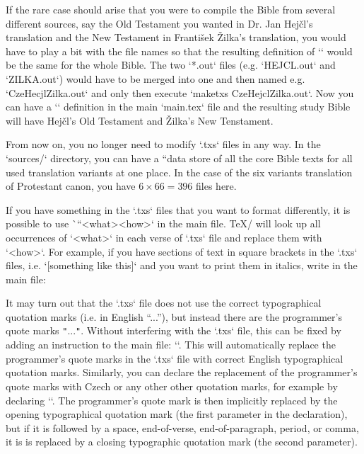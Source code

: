 {If the rare case should arise that you were to compile the Bible from several different sources, say the Old Testament you wanted in Dr. Jan Hejčl's translation and the New Testament in František Žilka's translation, you would have to play a bit with the file names so that the resulting definition of `\tmark` would be the same for the whole Bible. The two `*.out` files (e.g. `HEJCL.out` and `ZILKA.out`) would have to be merged into one and then named e.g. `CzeHecjlZilka.out` and  only then execute `maketxs CzeHejclZilka.out`.  Now you can have a `\def\tmark{HejclZilka}` definition in the main `main.tex` file and 
the resulting study Bible will have Hejčl's Old Testament and Žilka's New Tenstament.




From now on, you no longer need to modify  `.txs` files in any way.
In the `sources/` directory, you can have a “data store of all the core Bible texts for all used translation variants at one place. In the case of the six variants
translation of Protestant canon, you have $6 \times 66=396$ files here.



If you have something in the `.txs` files that you want to format differently, it is 
possible to use \`\cnvtext``{<what>}{<how>}` in the main file. 
\TeX/  will look up all occurrences of `<what>` in each verse of `.txs` file and replace them with `<how>`.
For example, if you have sections of text in square brackets in the `.txs` files, i.e.
`[something like this]` and you want to print them in italics, write in the main file:
\begtt
\cnvtext{[}{\bgroup\it} \cnvtext{]}{\/\egroup}
\endtt

It may turn out that the `.txs` file does not use the correct typographical quotation marks (i.e. in English “...”), but instead there are the programmer's quote marks {\tt"}...{\tt"}. 
Without interfering with the `.txs` file, this can be fixed by adding an instruction to
the main file:
``.
This will automatically replace the programmer's quote marks in the `.txs` file with correct English  typographical quotation marks. 
Similarly, you can declare the replacement of the programmer's quote marks
with Czech or any other other quotation marks, for example by declaring
``.
The programmer's quote mark is then implicitly
replaced by the opening typographical quotation mark (the first parameter in the 
declaration), but if it is followed by a space, end-of-verse, end-of-paragraph, period, 
or comma, it is is replaced by a closing typographic quotation mark (the second 
parameter).

}

